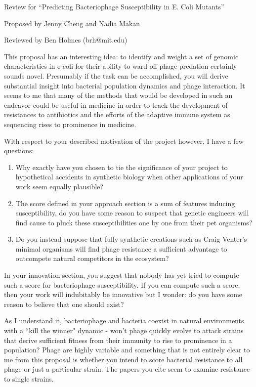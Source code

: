 \documentclass{letter}
\begin{document}
Review for ``Predicting Bacteriophage Susceptibility in E. Coli Mutants''

Proposed by Jenny Cheng and Nadia Makan

Reviewed by Ben Holmes (brh@mit.edu)

This proposal has an interesting idea: to identify and weight a set of genomic characteristics in e-coli for their ability to ward off phage predation certainly sounds novel. Presumably if the task can be accomplished, you will derive substantial insight into bacterial population dynamics and phage interaction. It seems to me that many of the methods that would be developed in such an endeavor could be useful in medicine in order to track the development of resistances to antibiotics and the efforts of the adaptive immune system as sequencing rises to prominence in medicine.

With respect to your described motivation of the project however, I have a few questions:

\begin{enumerate}
\item{Why exactly have you chosen to tie the significance of your project to hypothetical accidents in synthetic biology when other applications of your work seem equally plausible?}
\item{The score defined in your approach section is a sum of features inducing susceptibility, do you have some reason to suspect that genetic engineers will find cause to pluck these susceptibilities one by one from their pet organisms?}
\item{Do you instead suppose that fully synthetic creations such as Craig Venter's minimal organisms will find phage resistance a sufficient advantage to outcompete natural competitors in the ecosystem?}
\end{enumerate}

In your innovation section, you suggest that nobody has yet tried to compute such a score for bacteriophage susceptibility. If you can compute such a score, then your work will indubitably be innovative but I wonder: do you have some reason to believe that one should exist? 

As I understand it, bacteriophage and bacteria coexist in natural environments with a ``kill the winner" dynamic - won't phage quickly evolve to attack strains that derive sufficient fitness from their immunity to rise to prominence in a population? Phage are highly variable and something that is not entirely clear to me from this proposal is whether you intend to score bacterial resistance to all phage or just a particular strain. The papers you cite seem to examine resistance to single strains.
\end{document}
